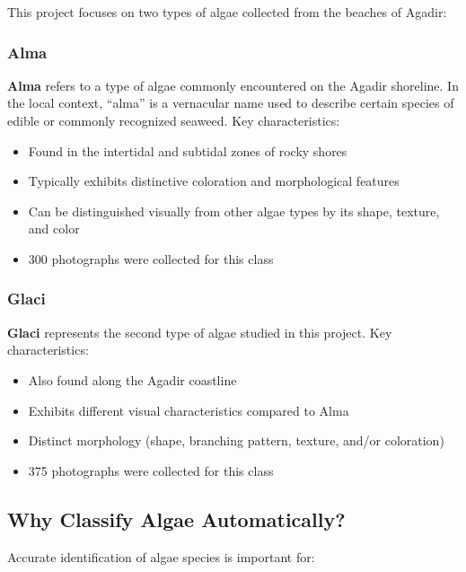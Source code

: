 \documentclass[12pt,a4paper]{article}
\begin{document}
This project focuses on two types of algae collected from the beaches of Agadir:

\subsubsection{Alma}

\textbf{Alma} refers to a type of algae commonly encountered on the Agadir shoreline. In the local context, ``alma'' is a vernacular name used to describe certain species of edible or commonly recognized seaweed. Key characteristics:

\begin{itemize}
    \item Found in the intertidal and subtidal zones of rocky shores
    \item Typically exhibits distinctive coloration and morphological features
    \item Can be distinguished visually from other algae types by its shape, texture, and color
    \item 300 photographs were collected for this class
\end{itemize}

\subsubsection{Glaci}

\textbf{Glaci} represents the second type of algae studied in this project. Key characteristics:

\begin{itemize}
    \item Also found along the Agadir coastline
    \item Exhibits different visual characteristics compared to Alma
    \item Distinct morphology (shape, branching pattern, texture, and/or coloration)
    \item 375 photographs were collected for this class
\end{itemize}

\subsection{Why Classify Algae Automatically?}

Accurate identification of algae species is important for:
\end{document}
